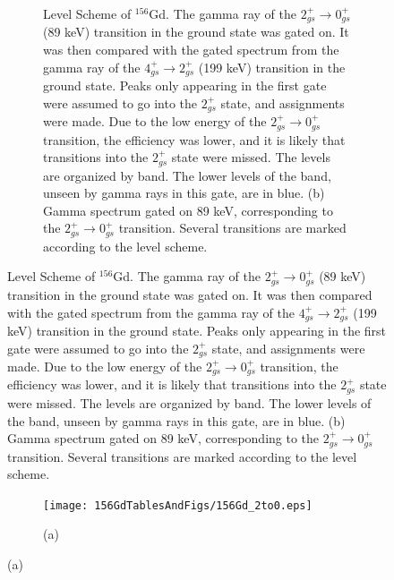 \begin{figure}[!]
    \centering
    \label{fig:156_2to0}
    \begin{subfigure}{\textwidth}
    \caption{\centering \fontsize{10pt}{12pt}Level Scheme of $^{156}$Gd. The gamma ray of the $2^+_{gs}\rightarrow 0^+_{gs}$ (89 keV) transition in the ground state was gated on. It was then compared with the gated spectrum from the gamma ray of the $4^+_{gs}\rightarrow 2^+_{gs}$ (199 keV) transition in the ground state. Peaks only appearing in the first gate were assumed to go into the $2^+_{gs}$ state, and assignments were made. Due to the low energy of the $2^+_{gs}\rightarrow 0^+_{gs}$ transition, the efficiency was lower, and it is likely that transitions into the $2^+_{gs}$ state were missed. The levels are organized by band. The lower levels of the band, unseen by gamma rays in this gate, are in blue. (b) Gamma spectrum gated on 89 keV, corresponding to the $2^+_{gs}\rightarrow 0^+_{gs}$ transition. Several transitions are marked according to the level scheme.}
    \end{subfigure}
\end{figure}
\clearpage
\begin{figure}
    \ContinuedFloat
    \begin{subfigure}{\textwidth}
    \texttt{[image: 156GdTablesAndFigs/156Gd\_2to0.eps]}
    \caption*{(a)}
    \label{fig:156_2to0level}
    \end{subfigure}
    \end{figure}
